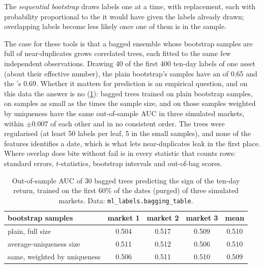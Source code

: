 \begin{definition}\label{def:ml:targets-labels-and-sample-weights:seqboot}
The \emph{sequential bootstrap} draws labels one at a time, with replacement, each with
probability proportional to the  it would have given the labels already drawn; overlapping labels
become less likely once one of them is in the sample.
\end{definition}

The case for these tools is that a bagged ensemble whose bootstrap samples are full of near-duplicates grows correlated
trees, each fitted to the same few independent observations. Drawing 40 of the first 400 ten-day labels of one asset
(about their effective number), the plain bootstrap's samples have an  of 0.65 and the 's 0.69. Whether it matters for prediction is an empirical question, and on this data the answer is no
(\cref{tab:ml:labels:bagging}): bagged trees trained on plain bootstrap samples, on samples as small as the  times the sample size, and on those samples weighted by uniqueness have the same out-of-sample AUC in three
simulated markets, within $\pm0.007$ of each other and in no consistent order. The trees were regularised (at least 50
labels per leaf, 5 in the small samples), and none of the features identifies a date, which is what lets
near-duplicates leak in the first place. Where overlap does bite without fail is in every statistic that counts rows:
standard errors, $t$-statistics, bootstrap intervals and out-of-bag scores.

\begin{table}[htbp]
\centering\small
\begin{tabular}{@{}lcccc@{}}
\toprule
bootstrap samples & market 1 & market 2 & market 3 & mean\\
\midrule
plain, full size & 0.504 & 0.517 & 0.509 & 0.510\\
average-uniqueness size & 0.511 & 0.512 & 0.506 & 0.510\\
same, weighted by uniqueness & 0.506 & 0.511 & 0.510 & 0.509\\
\bottomrule
\end{tabular}
\caption{Out-of-sample AUC of 30 bagged trees predicting the sign of the ten-day return, trained on the first 60\% of
the dates (purged) of three simulated markets. Data: \texttt{ml\_labels.bagging\_table}.}\label{tab:ml:labels:bagging}
\end{table}

